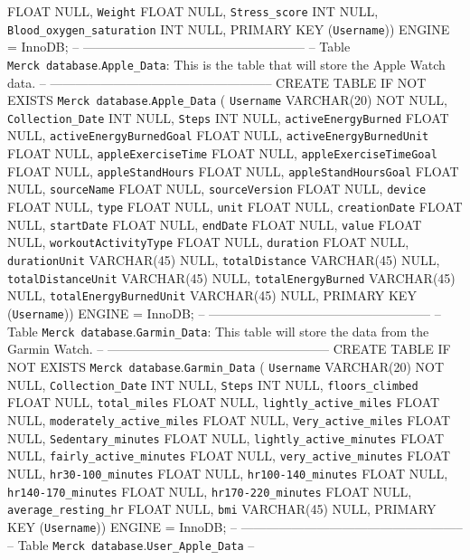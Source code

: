\documentclass[]{book}
\begin{document}
FLOAT NULL, \texttt{Weight} FLOAT NULL, \texttt{Stress\_score} INT NULL,
\texttt{Blood\_oxygen\_saturation} INT NULL, PRIMARY KEY
(\texttt{Username})) ENGINE = InnoDB; --
----------------------------------------------------- -- Table
\texttt{Merck\ database}.\texttt{Apple\_Data}: This is the table that
will store the Apple Watch data. --
----------------------------------------------------- CREATE TABLE IF
NOT EXISTS \texttt{Merck\ database}.\texttt{Apple\_Data} (
\texttt{Username} VARCHAR(20) NOT NULL, \texttt{Collection\_Date} INT
NULL, \texttt{Steps} INT NULL, \texttt{activeEnergyBurned} FLOAT NULL,
\texttt{activeEnergyBurnedGoal} FLOAT NULL,
\texttt{activeEnergyBurnedUnit} FLOAT NULL, \texttt{appleExerciseTime}
FLOAT NULL, \texttt{appleExerciseTimeGoal} FLOAT NULL,
\texttt{appleStandHours} FLOAT NULL, \texttt{appleStandHoursGoal} FLOAT
NULL, \texttt{sourceName} FLOAT NULL, \texttt{sourceVersion} FLOAT NULL,
\texttt{device} FLOAT NULL, \texttt{type} FLOAT NULL, \texttt{unit}
FLOAT NULL, \texttt{creationDate} FLOAT NULL, \texttt{startDate} FLOAT
NULL, \texttt{endDate} FLOAT NULL, \texttt{value} FLOAT NULL,
\texttt{workoutActivityType} FLOAT NULL, \texttt{duration} FLOAT NULL,
\texttt{durationUnit} VARCHAR(45) NULL, \texttt{totalDistance}
VARCHAR(45) NULL, \texttt{totalDistanceUnit} VARCHAR(45) NULL,
\texttt{totalEnergyBurned} VARCHAR(45) NULL,
\texttt{totalEnergyBurnedUnit} VARCHAR(45) NULL, PRIMARY KEY
(\texttt{Username})) ENGINE = InnoDB; --
----------------------------------------------------- -- Table
\texttt{Merck\ database}.\texttt{Garmin\_Data}: This table will store
the data from the Garmin Watch. --
----------------------------------------------------- CREATE TABLE IF
NOT EXISTS \texttt{Merck\ database}.\texttt{Garmin\_Data} (
\texttt{Username} VARCHAR(20) NOT NULL, \texttt{Collection\_Date} INT
NULL, \texttt{Steps} INT NULL, \texttt{floors\_climbed} FLOAT NULL,
\texttt{total\_miles} FLOAT NULL, \texttt{lightly\_active\_miles} FLOAT
NULL, \texttt{moderately\_active\_miles} FLOAT NULL,
\texttt{Very\_active\_miles} FLOAT NULL, \texttt{Sedentary\_minutes}
FLOAT NULL, \texttt{lightly\_active\_minutes} FLOAT NULL,
\texttt{fairly\_active\_minutes} FLOAT NULL,
\texttt{very\_active\_minutes} FLOAT NULL, \texttt{hr30-100\_minutes}
FLOAT NULL, \texttt{hr100-140\_minutes} FLOAT NULL,
\texttt{hr140-170\_minutes} FLOAT NULL, \texttt{hr170-220\_minutes}
FLOAT NULL, \texttt{average\_resting\_hr} FLOAT NULL, \texttt{bmi}
VARCHAR(45) NULL, PRIMARY KEY (\texttt{Username})) ENGINE = InnoDB; --
----------------------------------------------------- -- Table
\texttt{Merck\ database}.\texttt{User\_Apple\_Data} --
\end{document}
